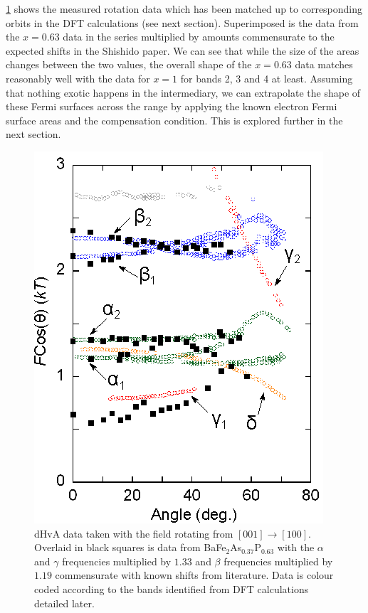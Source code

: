 \Fig\ref{Fig:3:SubstitutionComparison} shows the measured rotation data which has been matched up to corresponding orbits in the DFT calculations (see next section). Superimposed is the data from the $x=0.63$ data in the \BaFePAs series multiplied by amounts commensurate to the expected shifts in the Shishido paper\cite{Shishido2010}. We can see that while the size of the areas changes between the two values, the overall shape of the $x=0.63$ data matches reasonably well with the data for $x=1$ for bands 2, 3 and 4 at least. Assuming that nothing exotic happens in the intermediary, we can extrapolate the shape of these Fermi surfaces across the range by applying the known electron Fermi surface areas and the compensation condition. This is explored further in the next section.
\begin{figure}
    \begin{center}
        \includegraphics[scale=0.9]{Chapter3-dHvABaFe2P2/Figures/AngleDepMeasurements/SubstitutionComparison/SubstitutionComparison}
        \caption{dHvA data taken with the field rotating from $[001]\rightarrow[100]$. Overlaid in black squares is data from BaFe$_2$As$_{0.37}$P$_{0.63}$\cite{Analytis2010c} with the $\alpha$ and $\gamma$ frequencies multiplied by $1.33$ and $\beta$ frequencies multiplied by $1.19$ commensurate with known shifts from literature. Data is colour coded according to the bands identified from DFT calculations detailed later.}
        \label{Fig:3:SubstitutionComparison}
    \end{center}
\end{figure}

